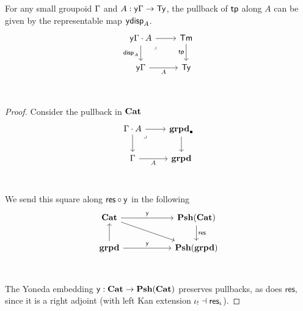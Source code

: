 \begin{cor}
  For any small groupoid $\Gamma$ and $A : \mathsf{y} \Gamma \to \mathsf{Ty}$,
  the pullback of $\mathsf{tp}$ along $A$ can be given by the representable
  map $\mathsf{y} \mathsf{disp}_{A}$.
  \[\begin{tikzcd}
    {\yo \Ga \cdot A} & \Term \\
    {\yo \Ga} & \Type \\
    {}
    \arrow[from=1-1, to=1-2]
    \arrow["{\disp A}"', from=1-1, to=2-1]
    \arrow["\lrcorner"{anchor=center, pos=0.125}, draw=none, from=1-1, to=2-2]
    \arrow["\tp"', from=1-2, to=2-2]
    \arrow["A"', from=2-1, to=2-2]
  \end{tikzcd}\]
\end{cor}
\begin{proof}
  Consider the pullback in $\mathbf{Cat}$
  \[\begin{tikzcd}
    {\Ga \cdot A} & \ptgrpd \\
    \Ga & \grpd \\
    {}
    \arrow[from=1-1, to=1-2]
    \arrow[from=1-1, to=2-1]
    \arrow["\lrcorner"{anchor=center, pos=0.125}, draw=none, from=1-1, to=2-2]
    \arrow[from=1-2, to=2-2]
    \arrow["A"', from=2-1, to=2-2]
  \end{tikzcd}\]
  We send this square along $\textsf{res} \circ \mathsf{y}$ in the following
  \[\begin{tikzcd}
    \Cat && \PshCat \\
    \grpd && \Pshgrpd \\
    & {}
    \arrow["\yo", from=1-1, to=1-3]
    \arrow[from=1-1, to=2-3]
    \arrow["{\textsf{res}}", from=1-3, to=2-3]
    \arrow[from=2-1, to=1-1]
    \arrow["\yo", from=2-1, to=2-3]
  \end{tikzcd}\]
  The Yoneda embedding $\mathsf{y} : \mathbf{Cat} \to \mathbf{Psh}(\mathbf{Cat})$ preserves pullbacks,
  as does $\textsf{res}$,
  since it is a right adjoint
  (with left Kan extension $\iota_{!} \dashv \textsf{res}_{\iota}$).
\end{proof}
